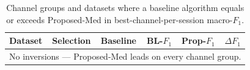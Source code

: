 \begin{table}[ht]
  \centering
  \caption{Channel groups and datasets where a baseline algorithm equals or exceeds Proposed-Med in best-channel-per-session macro-$F_1$.}
  \label{tab:exp2_inversions}
  \begin{tabular}{lllccc}
    \toprule
    Dataset & Selection & Baseline & BL-$F_1$ & Prop-$F_1$ & $\Delta F_1$ \\
    \midrule
    \multicolumn{6}{c}{No inversions --- Proposed-Med leads on every channel group.} \\
    \bottomrule
  \end{tabular}
\end{table}
